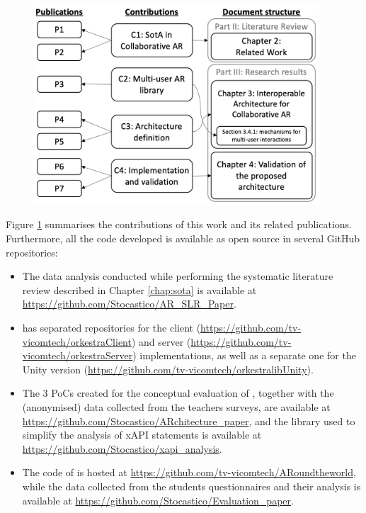 \begin{figure}[htbp]
    \centering
    \includegraphics[width=0.95\textwidth]{Conclusions/figures/contrib_diagram.png}
    \caption{\fontsize{10pt}{11pt}}
    \label{fig:contribs}
\end{figure}

Figure \ref{fig:contribs} summarises the contributions of this work and its related publications.
Furthermore, all the code developed is available as open source in several GitHub repositories:

\begin{itemize}
    \item The data analysis conducted while performing the systematic literature review described in Chapter \ref{chap:sota} is available at \url{https://github.com/Stocastico/AR_SLR_Paper}.
    \item \ork{} has separated repositories for the client (\url{https://github.com/tv-vicomtech/orkestraClient}) and server (\url{https://github.com/tv-vicomtech/orkestraServer}) implementations, as well as a separate one for the Unity version (\url{https://github.com/tv-vicomtech/orkestralibUnity}).
    \item The 3 PoCs created for the conceptual evaluation of \arch{}, together with the (anonymised) data collected from the teachers surveys, are available at \url{https://github.com/Stocastico/ARchitecture_paper}, and the library used to simplify the analysis of xAPI statements is available at \url{https://github.com/Stocastico/xapi_analysis}.
    \item The code of \appname{} is hosted at \url{https://github.com/tv-vicomtech/ARoundtheworld}, while the data collected from the students questionnaires and their analysis is available at \url{https://github.com/Stocastico/Evaluation_paper}.
\end{itemize}

